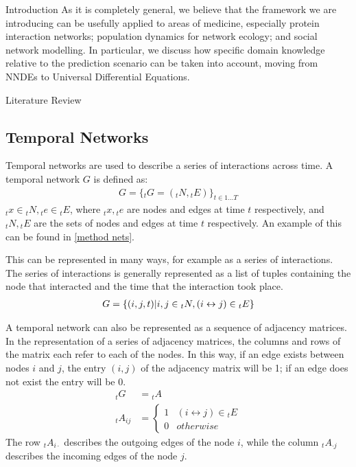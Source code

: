 \documentclass[12pt]{amsart}
\begin{document}
\begin{section}{Introduction}
    As it is completely general, we believe that the framework we are introducing can be usefully applied to areas of medicine, especially protein interaction networks; population dynamics for network ecology; and social network modelling. In particular, we discuss how specific domain knowledge relative to the prediction scenario can be taken into account, moving from NNDEs to Universal Differential Equations.
\end{section}

\begin{section}{Literature Review}

    \subsection{Temporal Networks}
        Temporal networks are used to describe a series of interactions across time.
        A temporal network $G$ is defined as:  
        \begin{align}
            G=\{ {_t} G=({_t} N, {_t} E)\} _{t \in 1\ldots T } 
        \end{align}
        $_t x \in {_t} N, {_t} e\in {_t} E$, where ${_t} x, {_t} e$ are nodes and edges at time $t$ respectively, and ${_t} N, {_t} E$ are the sets of nodes and edges at time $t$ respectively.
        An example of this can be found in \autoref{method nets}.
        
        This can be represented in many ways, for example as a series of interactions. The series of interactions is generally represented as a list of tuples containing the node that interacted and the time that the interaction took place. 
        \begin{align}
            G=\{(i, j, t)|\space i,j\in {_t} N, (i\leftrightarrow j)\in {_t}E \}
        \end{align}
        
        A temporal network can also be represented as a sequence of adjacency matrices. In the representation of a series of adjacency matrices, the columns and rows of the matrix each refer to each of the nodes. In this way, if an edge exists between nodes $i$ and $j$, the entry $(i,j)$ of the adjacency matrix will be 1; if an edge does not exist the entry will be 0.
        \begin{align}
            _t G &= {_t} A\\
            _t A_{ij} &=  
            \left\{
                \begin{array}{ll} 
                1 & (i\leftrightarrow j)\in {_t} E\\
                0 & otherwise
                \end{array}
            \right.
        \end{align}
        The row $_t A_{i\cdot}$ describes the outgoing edges of the node $i$, while the column $_t A_{\cdot j}$ describes the incoming edges of the node $j$.


\end{section}
\end{document}
